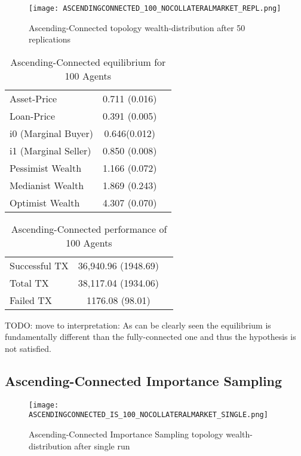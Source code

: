 \documentclass[Bachelorarbeit.tex]{subfiles}
\begin{document}
\begin{figure}[!htbp]
	\centering
  \texttt{[image: ASCENDINGCONNECTED\_100\_NOCOLLATERALMARKET\_REPL.png]}
	\caption{Ascending-Connected topology wealth-distribution after 50 replications}
	\label{fig1}
\end{figure}

\begin{table}[h]
	\caption{Ascending-Connected equilibrium for 100 Agents}
	\centering
	\begin{tabular} { l c r }
		\hline
		Asset-Price & 0.711 (0.016) \\
		Loan-Price & 0.391 (0.005) \\
		i0 (Marginal Buyer) & 0.646(0.012) \\
		i1 (Marginal Seller) & 0.850 (0.008) \\
		Pessimist Wealth & 1.166 (0.072) \\
		Medianist Wealth & 1.869 (0.243) \\
		Optimist Wealth & 4.307 (0.070) \\
		\hline
	\end{tabular}
\end{table} 

\begin{table}[h]
	\caption{Ascending-Connected performance of 100 Agents}
	\centering
	\begin{tabular} { l c r }
		\hline
		Successful TX & 36,940.96 (1948.69) \\
		Total TX & 38,117.04 (1934.06) \\
		Failed TX & 1176.08 (98.01) \\
		\hline
	\end{tabular}
\end{table}

TODO: move to interpretation: As can be clearly seen the equilibrium is fundamentally different than the fully-connected one and thus the hypothesis is not satisfied.

\subsection{Ascending-Connected Importance Sampling}
\begin{figure}[!htbp]
	\centering
  \texttt{[image: ASCENDINGCONNECTED\_IS\_100\_NOCOLLATERALMARKET\_SINGLE.png]}
	\caption{Ascending-Connected Importance Sampling topology wealth-distribution after single run}
	\label{fig1}
\end{figure}
\end{document}
